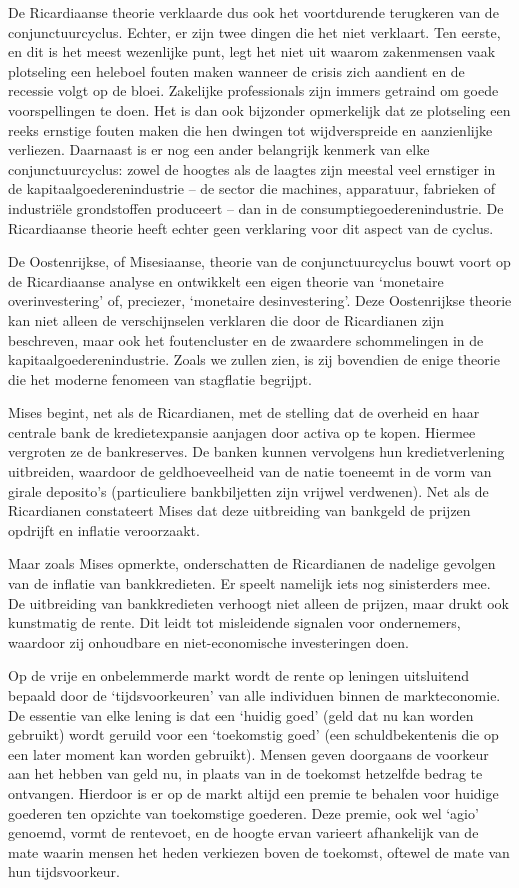 \documentclass[
  a5paper,
  smalldemyvopaper,10pt,twoside,onecolumn,openright,extrafontsizes,hidelinks]{memoir}
\begin{document}
De Ricardiaanse theorie verklaarde dus ook het voortdurende terugkeren
van de conjunctuurcyclus. Echter, er zijn twee dingen die het niet
verklaart. Ten eerste, en dit is het meest wezenlijke punt, legt het
niet uit waarom zakenmensen vaak plotseling een heleboel fouten maken
wanneer de crisis zich aandient en de recessie volgt op de bloei.
Zakelijke professionals zijn immers getraind om goede voorspellingen te
doen. Het is dan ook bijzonder opmerkelijk dat ze plotseling een reeks
ernstige fouten maken die hen dwingen tot wijdverspreide en aanzienlijke
verliezen. Daarnaast is er nog een ander belangrijk kenmerk van elke
conjunctuurcyclus: zowel de hoogtes als de laagtes zijn meestal veel
ernstiger in de kapitaalgoederenindustrie -- de sector die machines,
apparatuur, fabrieken of industriële grondstoffen produceert -- dan in
de consumptiegoederenindustrie. De Ricardiaanse theorie heeft echter
geen verklaring voor dit aspect van de cyclus.

De Oostenrijkse, of Misesiaanse, theorie van de conjunctuurcyclus bouwt
voort op de Ricardiaanse analyse en ontwikkelt een eigen theorie van
`monetaire overinvestering' of, preciezer, `monetaire desinvestering'.
Deze Oostenrijkse theorie kan niet alleen de verschijnselen verklaren
die door de Ricardianen zijn beschreven, maar ook het foutencluster en
de zwaardere schommelingen in de kapitaalgoederenindustrie. Zoals we
zullen zien, is zij bovendien de enige theorie die het moderne fenomeen
van stagflatie begrijpt.

Mises begint, net als de Ricardianen, met de stelling dat de overheid en
haar centrale bank de kredietexpansie aanjagen door activa op te kopen.
Hiermee vergroten ze de bankreserves. De banken kunnen vervolgens hun
kredietverlening uitbreiden, waardoor de geldhoeveelheid van de natie
toeneemt in de vorm van girale deposito's (particuliere bankbiljetten
zijn vrijwel verdwenen). Net als de Ricardianen constateert Mises dat
deze uitbreiding van bankgeld de prijzen opdrijft en inflatie
veroorzaakt.

Maar zoals Mises opmerkte, onderschatten de Ricardianen de nadelige
gevolgen van de inflatie van bankkredieten. Er speelt namelijk iets nog
sinisterders mee. De uitbreiding van bankkredieten verhoogt niet alleen
de prijzen, maar drukt ook kunstmatig de rente. Dit leidt tot
misleidende signalen voor ondernemers, waardoor zij onhoudbare en
niet-economische investeringen doen.

Op de vrije en onbelemmerde markt wordt de rente op leningen uitsluitend
bepaald door de `tijdsvoorkeuren' van alle individuen binnen de
markteconomie. De essentie van elke lening is dat een `huidig goed'
(geld dat nu kan worden gebruikt) wordt geruild voor een `toekomstig
goed' (een schuldbekentenis die op een later moment kan worden
gebruikt). Mensen geven doorgaans de voorkeur aan het hebben van geld
nu, in plaats van in de toekomst hetzelfde bedrag te ontvangen. Hierdoor
is er op de markt altijd een premie te behalen voor huidige goederen ten
opzichte van toekomstige goederen. Deze premie, ook wel `agio' genoemd,
vormt de rentevoet, en de hoogte ervan varieert afhankelijk van de mate
waarin mensen het heden verkiezen boven de toekomst, oftewel de mate van
hun tijdsvoorkeur.
\end{document}

